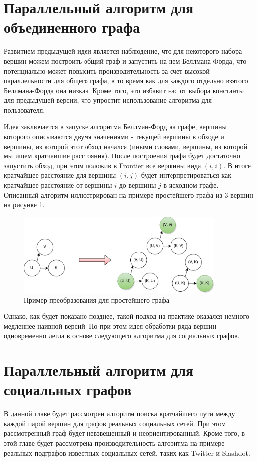 \FloatBarrier
\section{Параллельный алгоритм для объединенного графа}
Развитием предыдущей идеи является наблюдение, что для некоторого набора вершин можем построить общий граф и запустить на нем Беллмана-Форда, что потенциально может повысить производительность за счет высокой параллельности для общего графа, в то время как для каждого отдельно взятого Беллмана-Форда она низкая. Кроме того, это избавит нас от выбора константы для предыдущей версии, что упростит использование алгоритма для пользователя. 

Идея заключается в запуске алгоритма Беллман-Форд на графе, вершины которого описываются двумя значениями - текущей вершины в обходе и вершины, из которой этот обход начался (иными словами, вершины, из которой мы ищем кратчайшие расстояния). После построения графа будет достаточно запустить обход, при этом положив в Frontier все вершины вида $(i, i)$. В итоге кратчайшее расстояние для вершины $(i, j)$ будет интерпретироваться как кратчайшее расстояние от вершины $i$ до вершины $j$ в исходном графе. Описанный алгоритм иллюстрирован на примере простейшего графа из 3 вершин на рисунке \ref{floyd_par_common_graph}. 
\FloatBarrier

\begin{figure}[h]
\caption{Пример преобразования для простейшего графа}
\label {floyd_par_common_graph}
\centering
\includegraphics[width=0.9\textwidth]{img/floyd_par_2.png}
\end{figure}
\FloatBarrier

Однако, как будет показано позднее, такой подход на практике оказался немного медленнее наивной версий. Но при этом идея обработки ряда вершин одновременно легла в основе следующего алгоритма для социальных графов. 
\FloatBarrier
\section{Параллельный алгоритм для социальных графов}
В данной главе будет рассмотрен алгоритм поиска кратчайшего пути между каждой парой вершин для графов реальных социальных сетей. При этом рассмотренный граф будет невзвешенный и неориентированный. Кроме того, в этой главе будет рассмотрена производительность алгоритма на примере реальных подграфов известных социальных сетей, таких как Twitter и Slashdot\cite{STANFORDGRAPHS}.

